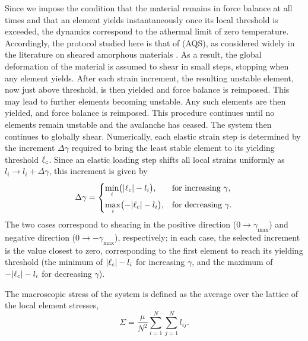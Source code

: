 Since we impose the condition that the material remains in force balance at all times and that an element yields instantaneously once its local threshold is exceeded, the dynamics correspond to the athermal limit of zero temperature. Accordingly, the protocol studied here is that of  (AQS), as considered widely in the literature on sheared amorphous materials \cite{liuCreepDynamicsAthermal2018,barlow_ductile_2020,pollard_yielding_2022,maloney_amorphous_2006,Popovi2018,ness_oscillatory_2017,Fiocco2013,Ruscher2021,khandareElastoplasticModellingCyclic2026}. As a result, the global deformation of the material is assumed to shear in small steps, stopping when any element yields. After each strain increment, the resulting unstable element, now just above threshold, is then yielded and force balance is reimposed. This may lead to further elements becoming unstable. Any such elements are then yielded, and force balance is reimposed. This procedure continues until no elements remain unstable and the avalanche has ceased. The system then continues to globally shear. Numerically, each elastic strain step is determined by the increment $\Delta\gamma$ required to bring the least stable element to its yielding threshold $\ell_c$. Since an elastic loading step shifts all local strains uniformly as $l_i \to l_i + \Delta\gamma$, this increment is given by
\begin{equation*}
\Delta \gamma =
\begin{cases}
\displaystyle \min_i \bigl( |\ell_c| - l_i \bigr),
& \text{for increasing $\gamma$}, \\[6pt]
\displaystyle \max_i \bigl( -|\ell_c| - l_i \bigr),
& \text{for decreasing $\gamma$}.
\end{cases}
\end{equation*}
The two cases correspond to shearing in the positive direction ($0 \to \gamma_{\max}$) and negative direction ($0 \to -\gamma_{\max}$), respectively; in each case, the selected increment is the value closest to zero, corresponding to the first element to reach its yielding threshold (the minimum of $|\ell_c|-l_i$ for increasing $\gamma$, and the maximum of $-|\ell_c|-l_i$ for decreasing $\gamma$).

The macroscopic stress of the system is defined as the average over the lattice of the local element stresses,
\begin{equation}
    \Sigma = \frac{\mu}{N^2}\sum_{i=1}^{N}\sum_{j=1}^{N} l_{ij}.
\end{equation}

